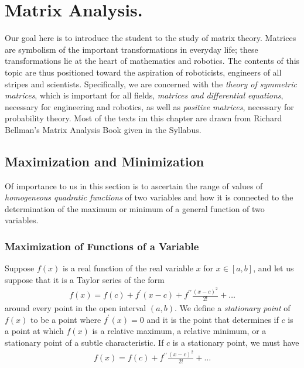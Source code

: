\chapter{Matrix Analysis.}  
 \label{chap:mat_anal::intro}
 
 Our goal here is to introduce the student to the study of matrix theory. Matrices are symbolism of the important transformations in everyday life; these transformations lie at the heart of mathematics and robotics. The contents of this topic are thus positioned toward the aspiration of roboticists, engineers of all stripes and scientists. Specifically, we are concerned with the \textit{theory of symmetric matrices},  which is important for all fields, \textit{matrices and differential equations}, necessary for engineering and robotics, as well as \textit{positive matrices}, necessary for probability theory. Most of the texts im this chapter are drawn from Richard Bellman's Matrix Analysis Book given in the Syllabus.
 
 \section{Maximization and Minimization}
 Of importance to us in this section is to ascertain the range of values of \textit{homogeneous quadratic functions} of two variables and how it is connected to the determination of the maximum or minimum of a general function of two variables.
 
 \subsection{Maximization of Functions of a Variable}
 Suppose $f(x)$ is a real function of the real variable $x$ for $x \in \left[a, b\right]$, and let us suppose that it is a Taylor series of the form 
 \begin{align}
 	f(x) = f(c) + f^\prime (x-c) + f^{\prime\prime}\frac{\left(x-c\right)^2}{2!} + \ldots
 \end{align}
 around every point in the open interval $\left(a, b\right)$. We define a \textit{stationary point} of $f(x)$ to be a point where $f^\prime(x) = 0$ and it is the point that determines if $c$ is a point at which $f(x)$ is a relative maximum, a relative minimum, or a stationary point of a subtle characteristic. If $c$ is a stationary point, we must have 
 \begin{align}
 	f(x) = f(c) + f^{\prime\prime}\frac{\left(x-c\right)^2}{2!} + \ldots
 \end{align}
 
